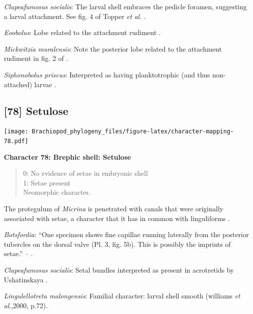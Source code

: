 \documentclass[openany]{book}
\theoremstyle{definition}
\theoremstyle{definition}
\theoremstyle{definition}
\theoremstyle{remark}
\begin{document}
\hypertarget{Clupeafumosus_socialis-coding-77}{}
\emph{Clupeafumosus socialis}: The larval shell embraces the pedicle
foramen, suggesting a larval attachment. See fig. 4 of Topper \emph{et
al}. \citeyearpar{Topper2013Reappraisalof}.

\hypertarget{Eoobolus-coding-77}{}
\emph{Eoobolus}: Lobe related to the attachment rudiment \citep[fig.
2]{Balthasar2009Thebrachiopod}.

\hypertarget{Mickwitzia_muralensis-coding-77}{}
\emph{Mickwitzia muralensis}: Note the posterior lobe related to the
attachment rudiment in fig. 2 of \citet{Balthasar2009Thebrachiopod}.

\hypertarget{Siphonobolus_priscus-coding-77}{}
\emph{Siphonobolus priscus}: Interpreted as having planktotrophic (and
thus non-attached) larvae \citep{Popov2009Earlyontogeny}.

\subsection*{{[}78{]} Setulose}\label{setulose}

\texttt{[image: Brachiopod\_phylogeny\_files/figure-latex/character-mapping-78.pdf]}

\textbf{Character 78: Brephic shell: Setulose}

\begin{quote}
0: No evidence of setae in embryonic shell\\
1: Setae present\\
Neomorphic character.
\end{quote}

The protegulum of \emph{Micrina} is penetrated with canals that were
originally associated with setae, a character that it has in common with
linguliforms \citep{Holmer2011Firstrecord}.

\hypertarget{Botsfordia-coding-78}{}
\emph{Botsfordia}: ``One specimen shows fine capillae running laterally
from the posterior tubercles on the dorsal valve (Pl. 3, fig. 5b). This
is possibly the imprints of setae.'' --
\citet{Ushatinskaya2016Revisionof}.

\hypertarget{Clupeafumosus_socialis-coding-78}{}
\emph{Clupeafumosus socialis}: Setal bundles interpreted as present in
acrotretids by Ushatinskaya \citeyearpar{Ushatinskaya2016Protegulumand}.

\hypertarget{Lingulellotreta_malongensis-coding-78}{}
\emph{Lingulellotreta malongensis}: Familial character: larval shell
smooth (williams \emph{et al}.,2000, p.72).
\end{document}
